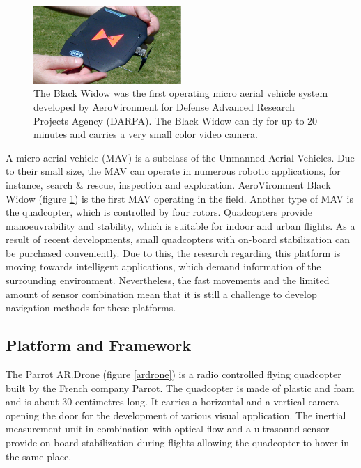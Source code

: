 \documentclass[a4paper]{article}
\begin{document}
\begin{figure}[!h]
	\centering
	\includegraphics[width=0.5\textwidth]{images/blackwidow.eps}
	\caption{The Black Widow was the first operating micro aerial vehicle system developed by AeroVironment for Defense Advanced Research Projects Agency (DARPA). The Black Widow can fly for up to 20 minutes and carries a very small color video camera.}
	\label{blackwidow}
\end{figure}

A micro aerial vehicle (MAV) is a subclass of the Unmanned Aerial Vehicles. Due to their small size, the MAV can operate in numerous robotic applications, for instance, search \&  rescue, inspection and exploration. AeroVironment Black Widow (figure \ref{blackwidow}) is the first MAV operating in the field. Another type of MAV is the quadcopter, which is controlled by four rotors. Quadcopters provide manoeuvrability and stability, which is suitable for indoor and urban flights. As a result of recent developments, small quadcopters with on-board stabilization can be purchased conveniently. Due to this, the research regarding this platform is moving towards intelligent applications, which demand information of the surrounding environment. Nevertheless, the fast movements and the limited amount of sensor combination mean that it is still a challenge to develop navigation methods for these platforms.

\subsection{Platform and Framework}
The Parrot AR.Drone (figure \ref{ardrone}) is a radio controlled flying quadcopter built by the French company Parrot. The quadcopter is made of plastic and foam and is about 30 centimetres long. It carries a horizontal and a vertical camera opening the door for the development of various visual application. The inertial measurement unit in combination with optical flow and a ultrasound sensor provide on-board stabilization during flights allowing the quadcopter to hover in the same place. 

\end{document}
